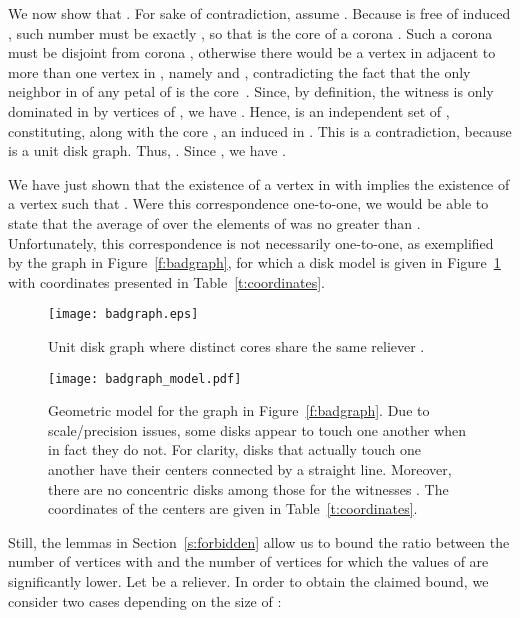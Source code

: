 \documentclass[preprint,12pt]{elsarticle}
\begin{document}
\begin{pf}
We now show that . For sake of contradiction, assume \linebreak . Because  is free of induced , such number must be \linebreak exactly , so that  is the core of a corona . Such a corona must be disjoint from corona , otherwise there would be a vertex in \mbox{} adjacent to more than one vertex in , namely  and , contradicting the fact that the only neighbor in  of any petal of  is the core~. Since, by definition, the witness  is only dominated in  by vertices of , we have . Hence,  is an independent set of , constituting, along with the core , an induced  in . This is a contradiction, because  is a unit disk graph. Thus, . Since , we have .

We have just shown that the existence of a vertex  in  with \mbox{} implies the existence of a vertex  such that . Were this correspondence one-to-one, we would be able to state that the average \linebreak of  over the elements of  was no greater than . Unfortunately, this correspondence is not necessarily one-to-one, as exemplified by the graph in Figure~\ref{f:badgraph}, for which a disk model is given in Figure~\ref{f:badgraph_model} with coordinates presented in Table~\ref{t:coordinates}.

\begin{figure}[t!]
 \centering
 \texttt{[image: badgraph.eps]}
 \caption{\label{f:badgraph} Unit disk graph where  distinct cores  share the same reliever .}
\bigskip
\bigskip
\bigskip
 \centering
 \texttt{[image: badgraph\_model.pdf]}
 \caption{\label{f:badgraph_model} Geometric model for the graph in Figure~\ref{f:badgraph}. Due to scale/precision issues, some disks appear to touch one another when in fact they do not. For clarity, disks that actually touch one another have their centers connected by a straight line. Moreover, there are no concentric disks among those for the witnesses . The coordinates of the centers are given in Table~\ref{t:coordinates}.}  
\end{figure}
 
Still, the lemmas in Section~\ref{s:forbidden} allow us to bound the ratio between the number of vertices  with  and the number of vertices  for which the values of  are significantly lower. Let  be a reliever. In order to obtain the claimed bound, we consider two cases depending on the size \linebreak of :

\smallskip


\end{pf}
\end{document}
